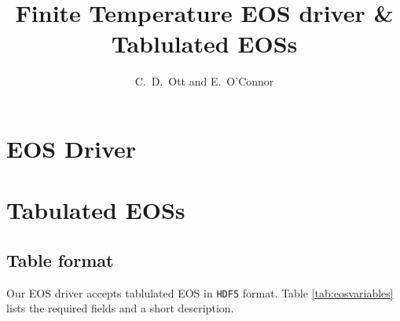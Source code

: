 \documentclass[10pt,nofootinbib]{article}
\title{Finite Temperature EOS driver \& Tablulated EOSs}
\author{C.\ D.\ Ott and E.\ O'Connor}
\newcommand{\code}[1]{\texttt{#1}}
\begin{document}
\maketitle

\section{EOS Driver}

\section{Tabulated EOSs}

\subsection{Table format}

Our EOS driver accepts tablulated EOS in \code{HDF5} format.  Table
\ref{tab:eosvariables} lists the required fields and a short
description.  
\end{document}
